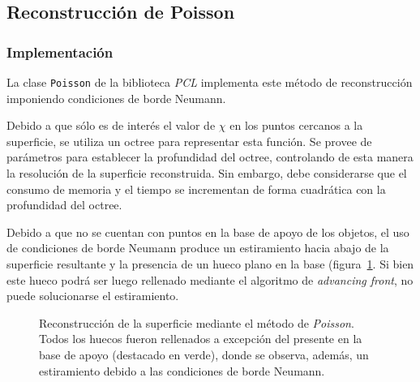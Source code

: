 	\subsection{Reconstrucción de Poisson}
	\subsubsection{Implementación}
	La clase \texttt{Poisson} de la biblioteca \emph{PCL} implementa este método de reconstrucción
	imponiendo condiciones de borde Neumann.

	Debido a que sólo es de interés el valor de $\chi$ en los puntos cercanos a
	la superficie, se utiliza un octree para representar esta función. Se
	provee de parámetros para establecer la profundidad del octree, controlando
	de esta manera la resolución de la superficie reconstruida.
	Sin embargo, debe considerarse que el consumo de memoria y el tiempo se incrementan de forma
	cuadrática con la profundidad del octree. 


	Debido a que no se cuentan con puntos en la base de apoyo de los objetos,
	el uso de condiciones de borde Neumann
	produce un estiramiento hacia abajo de la superficie resultante y la presencia de
	un hueco plano en la base (figura~\ref{fig:fill_poisson}.
	Si bien este hueco podrá ser luego rellenado mediante el algoritmo de \emph{advancing front},
	no puede solucionarse el estiramiento.



	\begin{figure}
		\caption{\label{fig:fill_poisson}Reconstrucción de la superficie mediante el método de \emph{Poisson}. Todos los huecos fueron rellenados a excepción del presente en la base de apoyo (destacado en verde), donde se observa, además, un estiramiento debido a las condiciones de borde Neumann.}
	\end{figure}

